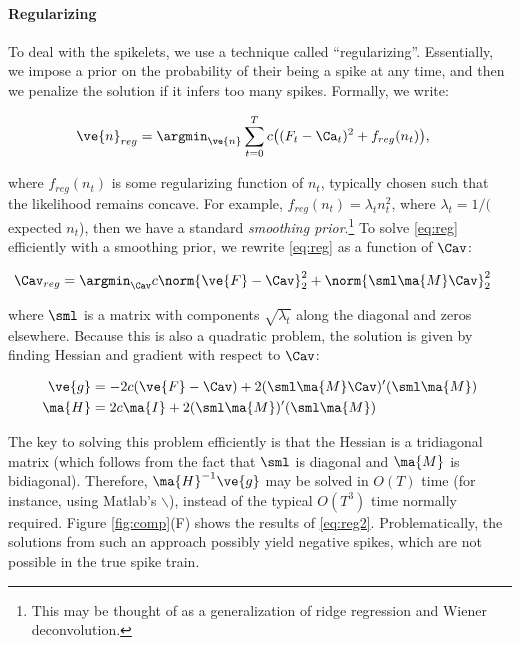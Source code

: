 \paragraph{Regularizing}

To deal with the spikelets, we use a technique called ``regularizing''.  Essentially, we impose a prior on the probability of their being a spike at any time, and then we penalize the solution if it infers too many spikes.  Formally, we write:

\begin{align} \label{eq:reg}
\ve{n}_{reg} &= \argmin_{\ve{n}} \sum_{t=0}^T c \big((F_t - \Ca_t)^2 + f_{reg}(n_t) \big),
\end{align}

\noindent where $f_{reg}(n_t)$ is some regularizing function of $n_t$, typically chosen such that the likelihood remains concave.  For example, $f_{reg}(n_t)=\lambda_t n_t^2$, where $\lambda_t=1/($expected $n_t$), then we have a standard \emph{smoothing prior}.\footnote{This may be thought of as a generalization of ridge regression and Wiener deconvolution.}  To solve \eqref{eq:reg} efficiently with a smoothing prior, we rewrite \eqref{eq:reg} as a function of $\Cav$:

\begin{align} \label{eq:reg2}
\Cav_{reg} &= \argmin_{\Cav} c\norm{\ve{F}-\Cav}_2^2 + \norm{\sml\ma{M}\Cav}_2^2
\end{align}


\noindent where $\sml$ is a matrix with components $\sqrt{\lambda_t}$ along the diagonal and zeros elsewhere. Because this is also a quadratic problem, the solution is given by finding Hessian and gradient with respect to $\Cav$:

\begin{align}
\ve{g} &= -2c(\ve{F}-\Cav)+2 (\sml\ma{M}\Cav)'(\sml\ma{M})\\
\ma{H} &= 2c\ma{I}+2(\sml\ma{M})'(\sml\ma{M})
\end{align}

The key to solving this problem efficiently is that the Hessian is a tridiagonal matrix (which follows from the fact that $\sml$ is diagonal and $\ma{M}$ is bidiagonal).  Therefore, $\ma{H}^{-1}\ve{g}$ may be solved in $O(T)$ time (for instance, using Matlab's $\backslash$), instead of the typical $O(T^3)$ time normally required.  Figure \ref{fig:comp}(F) shows the results of \eqref{eq:reg2}.  Problematically, the solutions from such an approach possibly yield negative spikes, which are not possible in the true spike train.  

